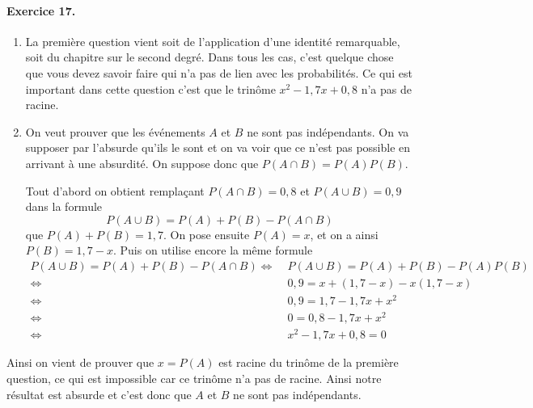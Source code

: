 \documentclass[11pt]{article}
\begin{document}
\paragraph{Exercice 17.}
\begin{enumerate}
  \item La première question vient soit de l'application d'une identité remarquable,
soit du chapitre sur le second degré. Dans tous les cas, c'est quelque chose que
vous devez savoir faire qui n'a pas de lien avec les probabilités. Ce qui est
important dans cette question c'est que le trinôme $x^2-1,7x+0,8$ n'a pas de
racine.
  \item On veut prouver que les événements $A$ et $B$ ne sont pas indépendants.
    On va supposer par l'absurde qu'ils le sont et on va voir que ce n'est pas
    possible en arrivant à une absurdité. On suppose donc que $P(A\cap
    B)=P(A)P(B)$.

    Tout d'abord on obtient remplaçant $P(A\cap B)=0,8$ et $P(A\cup B)=0,9$
    dans la formule
    \[
      P(A\cup B) = P(A)+P(B)-P(A\cap B)
    \]
    que $P(A)+P(B)=1,7$.
    On pose ensuite $P(A)=x$, et on a ainsi $P(B)=1,7-x$. Puis on utilise encore
    la même formule
    \begin{align*}
      P(A\cup B) = P(A)+P(B)-P(A\cap B) \Leftrightarrow &\;
      P(A\cup B) = P(A)+P(B)-P(A)P(B) \\
      \Leftrightarrow&\; 0,9 = x + (1,7-x) - x(1,7-x) \\
      \Leftrightarrow&\; 0,9 = 1,7 - 1,7x+x^2 \\
      \Leftrightarrow&\; 0 = 0,8 - 1,7x+x^2 \\
      \Leftrightarrow&\; x^2-1,7x+0,8 = 0
    \end{align*}
\end{enumerate}
Ainsi on vient de prouver que $x=P(A)$ est racine du trinôme de la première
question, ce qui est impossible car ce trinôme n'a pas de racine. Ainsi notre
résultat est absurde et c'est donc que $A$ et $B$ ne sont pas indépendants.
\end{document}
